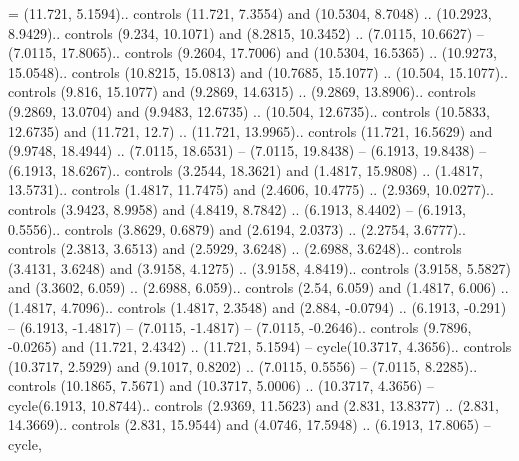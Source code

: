 \ctpdollar = {(11.721, 5.1594).. controls (11.721, 7.3554) and (10.5304, 8.7048) .. (10.2923, 8.9429).. controls (9.234, 10.1071) and (8.2815, 10.3452) .. (7.0115, 10.6627) -- (7.0115, 17.8065).. controls (9.2604, 17.7006) and (10.5304, 16.5365) .. (10.9273, 15.0548).. controls (10.8215, 15.0813) and (10.7685, 15.1077) .. (10.504, 15.1077).. controls (9.816, 15.1077) and (9.2869, 14.6315) .. (9.2869, 13.8906).. controls (9.2869, 13.0704) and (9.9483, 12.6735) .. (10.504, 12.6735).. controls (10.5833, 12.6735) and (11.721, 12.7) .. (11.721, 13.9965).. controls (11.721, 16.5629) and (9.9748, 18.4944) .. (7.0115, 18.6531) -- (7.0115, 19.8438) -- (6.1913, 19.8438) -- (6.1913, 18.6267).. controls (3.2544, 18.3621) and (1.4817, 15.9808) .. (1.4817, 13.5731).. controls (1.4817, 11.7475) and (2.4606, 10.4775) .. (2.9369, 10.0277).. controls (3.9423, 8.9958) and (4.8419, 8.7842) .. (6.1913, 8.4402) -- (6.1913, 0.5556).. controls (3.8629, 0.6879) and (2.6194, 2.0373) .. (2.2754, 3.6777).. controls (2.3813, 3.6513) and (2.5929, 3.6248) .. (2.6988, 3.6248).. controls (3.4131, 3.6248) and (3.9158, 4.1275) .. (3.9158, 4.8419).. controls (3.9158, 5.5827) and (3.3602, 6.059) .. (2.6988, 6.059).. controls (2.54, 6.059) and (1.4817, 6.006) .. (1.4817, 4.7096).. controls (1.4817, 2.3548) and (2.884, -0.0794) .. (6.1913, -0.291) -- (6.1913, -1.4817) -- (7.0115, -1.4817) -- (7.0115, -0.2646).. controls (9.7896, -0.0265) and (11.721, 2.4342) .. (11.721, 5.1594) -- cycle(10.3717, 4.3656).. controls (10.3717, 2.5929) and (9.1017, 0.8202) .. (7.0115, 0.5556) -- (7.0115, 8.2285).. controls (10.1865, 7.5671) and (10.3717, 5.0006) .. (10.3717, 4.3656) -- cycle(6.1913, 10.8744).. controls (2.9369, 11.5623) and (2.831, 13.8377) .. (2.831, 14.3669).. controls (2.831, 15.9544) and (4.0746, 17.5948) .. (6.1913, 17.8065) -- cycle},

